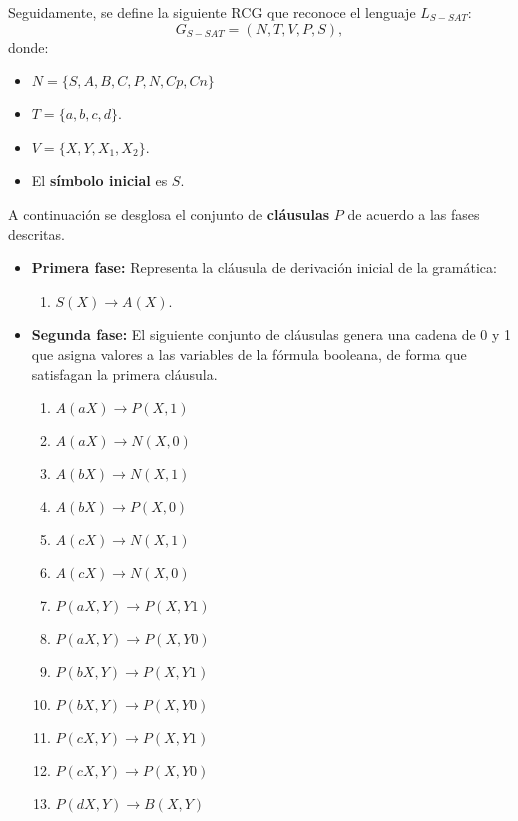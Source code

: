 Seguidamente, se define la siguiente RCG que reconoce el lenguaje $L_{S-SAT}$:
\[
    G_{S-SAT} = (N, T, V, P, S),
\]
donde:

\begin{itemize}
    \item $N=\{S,A,B,C,P,N,Cp,Cn\}$
    \item $T=\{a,b,c,d\}$.
    \item $V=\{X,Y,X_1,X_2\}$.
    \item El \textbf{símbolo inicial} es $S$.
\end{itemize}

A continuación se desglosa el conjunto de \textbf{cláusulas} $P$ de acuerdo a las fases descritas.

\begin{itemize}
    \item \textbf{Primera fase:} Representa la cláusula de derivación inicial de la gramática:
          \begin{enumerate}
              \item $S(X)\to A(X)$.
          \end{enumerate}
          
    \item \textbf{Segunda fase:} El siguiente conjunto de cláusulas genera una cadena de 0 y 1 que asigna valores a las
          variables de la fórmula booleana, de forma que satisfagan la primera cláusula.
          \begin{multicols}{2}
              \begin{enumerate}[start=2]
                  \item $A(aX)\to P(X,1)$
                  \item $A(aX)\to N(X,0)$
                  \item $A(bX)\to N(X,1)$
                  \item $A(bX)\to P(X,0)$
                  \item $A(cX)\to N(X,1)$
                  \item $A(cX)\to N(X,0)$
                        
                  \item $P(aX,Y)\to P(X,Y1)$
                  \item $P(aX,Y)\to P(X,Y0)$
                  \item $P(bX,Y)\to P(X,Y1)$
                  \item $P(bX,Y)\to P(X,Y0)$
                  \item $P(cX,Y)\to P(X,Y1)$
                  \item $P(cX,Y)\to P(X,Y0)$
                  \item $P(dX,Y)\to B(X,Y)$
                        

\end{enumerate}
\end{multicols}
\end{itemize}
